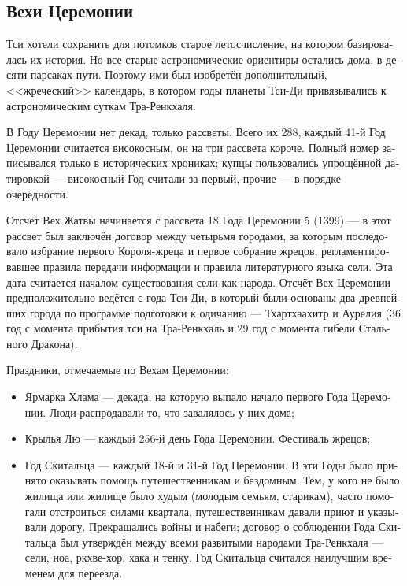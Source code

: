 \documentclass[a4paper,12pt,fleqn]{book}\usepackage{cooltooltips}\usepackage{polyglossia}\setdefaultlanguage[babelshorthands=true]{russian}\setotherlanguage{english}\defaultfontfeatures{Ligatures=TeX,Mapping=tex-text} \usepackage{xcolor}\definecolor{lightgray}{HTML}{bbbbbb}\color{lightgray}\newcommand{\ml}[3]{\textenglish{\textcolor{black}{#3}}}
\begin{document}
{%

\subsection{Вехи Церемонии}

Тси хотели сохранить для потомков старое летосчисление, на котором базировалась их история.
Но все старые астрономические ориентиры остались дома, в десяти парсаках пути.
Поэтому ими был изобретён дополнительный, <<жреческий>> календарь, в котором годы планеты Тси-Ди привязывались к астрономическим суткам Тра-Ренкхаля.

В Году Церемонии нет декад, только рассветы.
Всего их 288, каждый 41-й Год Церемонии считается високосным, он на три рассвета короче.
Полный номер записывался только в исторических хрониках;
купцы пользовались упрощённой датировкой --- високосный Год считали за первый, прочие --- в порядке очерёдности.

Отсчёт Вех Жатвы начинается с рассвета 18 Года Церемонии 5 (1399) --- в этот рассвет был заключён договор между четырьмя городами, за которым последовало избрание первого Короля-жреца и первое собрание жрецов, регламентировавшее правила передачи информации и правила литературного языка сели.
Эта дата считается началом существования сели как народа.
Отсчёт Вех Церемонии предположительно ведётся с года Тси-Ди, в который были основаны два древнейших города по программе подготовки к одичанию --- Тхартхаахитр и Аурелия (36 год с момента прибытия тси на Тра-Ренкхаль и 29 год с момента гибели Стального Дракона).

Праздники, отмечаемые по Вехам Церемонии:

\begin{itemize}
\item Ярмарка Хлама --- декада, на которую выпало начало первого Года Церемонии.
Люди распродавали то, что завалялось у них дома;
\item Крылья Лю --- каждый 256-й день Года Церемонии. Фестиваль жрецов;
\item Год Скитальца --- каждый 18-й и 31-й Год Церемонии. В эти Годы было принято оказывать помощь путешественникам и бездомным.
Тем, у кого не было жилища или жилище было худым (молодым семьям, старикам), часто помогали отстроиться силами квартала, путешественникам давали приют и указывали дорогу.
Прекращались войны и набеги;
договор о соблюдении Года Скитальца был утверждён между всеми развитыми народами Тра-Ренкхаля --- сели, ноа, ркхве-хор, хака и тенку.
Год Скитальца считался наилучшим временем для переезда.
\end{itemize}

}
\end{document}
